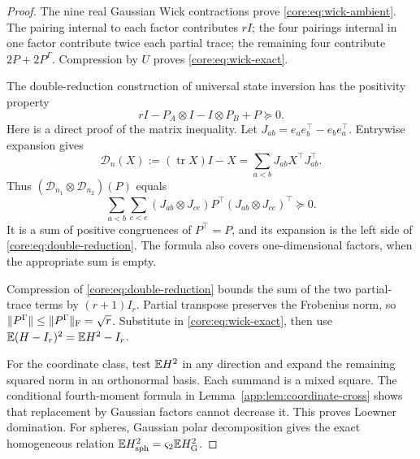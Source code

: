 \documentclass[11pt,a4paper]{article}
\theoremstyle{definition}\newtheorem{definition}[theorem]{Definition}
\theoremstyle{remark}\newtheorem{remark}[theorem]{Remark}
\numberwithin{equation}{section}
\newcommand{\norm}[1]{\lVert#1\rVert}\newcommand{\ip}[2]{\langle#1,#2\rangle}
\DeclareMathOperator{\tr}{tr}\DeclareMathOperator{\rank}{rank}
\begin{document}
\begin{proof}
The nine real Gaussian Wick contractions prove
\eqref{core:eq:wick-ambient}. The pairing internal to each factor
contributes $rI$; the four pairings internal in one factor contribute
twice each partial trace; the remaining four contribute
$2P+2P^\Gamma$. Compression by $U$ proves
\eqref{core:eq:wick-exact}.

The double-reduction construction of universal state inversion
\cite[Eq.~(2.11)]{Rungta2001} has the positivity property
\begin{equation}\label{core:eq:double-reduction}
 rI-P_A\otimes I-I\otimes P_B+P\succeq0.
\end{equation}
Here is a direct proof of the matrix inequality. Let
$J_{ab}=e_ae_b^\top-e_be_a^\top$. Entrywise expansion gives
\[
 \mathscr D_n(X):=(\tr X)I-X
       =\sum_{a<b}J_{ab}X^\top J_{ab}^\top.
\]
Thus $(\mathscr D_{n_1}\otimes\mathscr D_{n_2})(P)$ equals
\[
 \sum_{a<b}\sum_{c<e}
 (J_{ab}\otimes J_{ce})P^\top
                    (J_{ab}\otimes J_{ce})^\top\succeq0.
\]
It is a sum of positive congruences of $P^\top=P$, and its expansion
is the left side of \eqref{core:eq:double-reduction}.
The formula also covers one-dimensional factors, when the appropriate
sum is empty.

Compression of \eqref{core:eq:double-reduction} bounds the sum of the
two partial-trace terms by $(r+1)I_r$.
Partial transpose preserves the Frobenius norm, so
$\norm{P^\Gamma}\le\norm{P^\Gamma}_\F=\sqrt r$.
Substitute in \eqref{core:eq:wick-exact}, then use
$\mathbb E(H-I_r)^2=\mathbb E H^2-I_r$.

For the coordinate class, test $\mathbb E H^2$ in any direction and expand
the remaining squared norm in an orthonormal basis. Each summand is
a mixed square. The conditional fourth-moment formula in
Lemma~\ref{app:lem:coordinate-cross} shows that replacement by
Gaussian factors cannot decrease it. This proves Loewner domination.
For spheres, Gaussian polar decomposition gives the exact
homogeneous relation $\mathbb E H_{\rm sph}^2=\varsigma_2\mathbb E H_{\rm G}^2$.
\end{proof}
\end{document}
